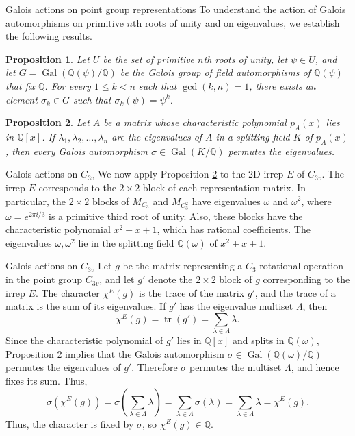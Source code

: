 \documentclass{beamer}
\DeclareMathOperator{\Gal}{Gal}
\DeclareMathOperator{\tr}{tr}
\newtheorem{proposition}{Proposition}
\begin{document}
    \begin{frame}{Galois actions on point group representations}
        To understand the action of Galois automorphisms on primitive $n$th roots of unity and on eigenvalues, we establish the following results.

        \begin{proposition}
            Let $U$ be the set of primitive $n$th roots of unity, let $\psi\in U$, and let $G=\Gal(\mathbb{Q}(\psi)/\mathbb{Q})$ be the Galois group of field automorphisms of $\mathbb{Q}(\psi)$ that fix $\mathbb{Q}$. For every $1\le k < n$ such that $\gcd(k,n)=1$, there exists an element $\sigma_k\in G$ such that $\sigma_k(\psi)=\psi^k$.
            \label{prop:allprimitiverootsofunityarehit}
        \end{proposition}

        {
            \begin{proposition}
                Let $A$ be a matrix whose characteristic polynomial $p_A(x)$ lies in $\mathbb{Q}[x]$. If $\lambda_1,\lambda_2,\ldots,\lambda_n$ are the eigenvalues of $A$ in a splitting field $K$ of $p_A(x)$, then every Galois automorphism $\sigma\in\Gal(K/\mathbb{Q})$ permutes the eigenvalues. \label{prop:galoispermuteeigs}
            \end{proposition}
        }
    \end{frame}

    \begin{frame}{Galois actions on $C_{3v}$}
        We now apply Proposition \ref{prop:galoispermuteeigs} to the 2D irrep $E$ of $C_{3v}$. The irrep $E$ corresponds to the $2\times 2$ block of each representation matrix. In particular, the $2\times2$ blocks of $M_{C_3}$ and $M_{C_3^2}$ have eigenvalues $\omega$ and $\omega^2$, where $\omega=e^{2\pi i/3}$ is a primitive third root of unity. Also, these blocks have the characteristic polynomial $x^2+x+1$, which has rational coefficients. The eigenvalues $\omega,\omega^2$ lie in the splitting field $\mathbb{Q}(\omega)$ of $x^2+x+1$.
    \end{frame}

    \begin{frame}{Galois actions on $C_{3v}$}
        Let $g$ be the matrix representing a $C_3$ rotational operation in the point group $C_{3v}$, and let $g'$ denote the $2\times2$ block of $g$ corresponding to the irrep $E$. The character $\chi^E(g)$ is the trace of the matrix $g'$, and the trace of a matrix is the sum of its eigenvalues. If $g'$ has the eigenvalue multiset $\Lambda$, then \[\chi^E(g)=\tr(g')=\sum_{\lambda\in\Lambda}\lambda.\] Since the characteristic polynomial of $g'$ lies in $\mathbb{Q}[x]$ and splits in $\mathbb{Q}(\omega)$, Proposition \ref{prop:galoispermuteeigs} implies that the Galois automorphism $\sigma\in\Gal(\mathbb{Q}(\omega)/\mathbb{Q})$ permutes the eigenvalues of $g'$. Therefore $\sigma$ permutes the multiset $\Lambda$, and hence fixes its sum. Thus,
        \[
            \sigma(\chi^E(g))=\sigma\left(\sum_{\lambda\in\Lambda}\lambda\right)=\sum_{\lambda\in\Lambda}\sigma(\lambda)=\sum_{\lambda\in\Lambda}\lambda=\chi^E(g).
        \]
        Thus, the character is fixed by $\sigma$, so $\chi^E(g)\in\mathbb{Q}$.
    \end{frame}
\end{document}
